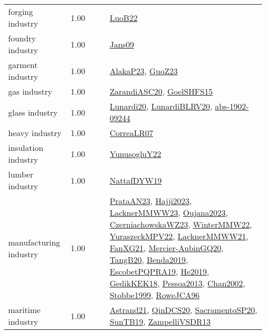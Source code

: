 {\begin{longtable}{p{3cm}r>{\raggedright\arraybackslash}p{6cm}>{\raggedright\arraybackslash}p{6cm}>{\raggedright\arraybackslash}p{8cm}}
\index{forging industry}\index{Industries!forging industry}forging industry &  1.00 &  &  & \hyperref[detail:LuoB22]{LuoB22}\\
\index{foundry industry}\index{Industries!foundry industry}foundry industry &  1.00 &  &  & \hyperref[detail:Jans09]{Jans09}\\
\index{garment industry}\index{Industries!garment industry}garment industry &  1.00 &  &  & \hyperref[detail:AlakaP23]{AlakaP23}, \hyperref[detail:GuoZ23]{GuoZ23}\\
\index{gas industry}\index{Industries!gas industry}gas industry &  1.00 &  &  & \hyperref[detail:ZarandiASC20]{ZarandiASC20}, \hyperref[detail:GoelSHFS15]{GoelSHFS15}\\
\index{glass industry}\index{Industries!glass industry}glass industry &  1.00 &  &  & \hyperref[detail:Lunardi20]{Lunardi20}, \hyperref[detail:LunardiBLRV20]{LunardiBLRV20}, \hyperref[detail:abs-1902-09244]{abs-1902-09244}\\
\index{heavy industry}\index{Industries!heavy industry}heavy industry &  1.00 &  &  & \hyperref[detail:CorreaLR07]{CorreaLR07}\\
\index{insulation industry}\index{Industries!insulation industry}insulation industry &  1.00 &  &  & \hyperref[detail:YunusogluY22]{YunusogluY22}\\
\index{lumber industry}\index{Industries!lumber industry}lumber industry &  1.00 &  &  & \hyperref[detail:NattafDYW19]{NattafDYW19}\\
\index{manufacturing industry}\index{Industries!manufacturing industry}manufacturing industry &  1.00 &  &  & \hyperref[detail:PrataAN23]{PrataAN23}, \hyperref[detail:Hajji2023]{Hajji2023}, \hyperref[detail:LacknerMMWW23]{LacknerMMWW23}, \hyperref[detail:Oujana2023]{Oujana2023}, \hyperref[detail:CzerniachowskaWZ23]{CzerniachowskaWZ23}, \hyperref[detail:WinterMMW22]{WinterMMW22}, \hyperref[detail:YuraszeckMPV22]{YuraszeckMPV22}, \hyperref[detail:LacknerMMWW21]{LacknerMMWW21}, \hyperref[detail:FanXG21]{FanXG21}, \hyperref[detail:Mercier-AubinGQ20]{Mercier-AubinGQ20}, \hyperref[detail:TangB20]{TangB20}, \hyperref[detail:Benda2019]{Benda2019}, \hyperref[detail:EscobetPQPRA19]{EscobetPQPRA19}, \hyperref[detail:He2019]{He2019}, \hyperref[detail:GedikKEK18]{GedikKEK18}, \hyperref[detail:Pessoa2013]{Pessoa2013}, \hyperref[detail:Chan2002]{Chan2002}, \hyperref[detail:Stobbe1999]{Stobbe1999}, \hyperref[detail:RoweJCA96]{RoweJCA96}\\
\index{maritime industry}\index{Industries!maritime industry}maritime industry &  1.00 &  &  & \hyperref[detail:Astrand21]{Astrand21}, \hyperref[detail:QinDCS20]{QinDCS20}, \hyperref[detail:SacramentoSP20]{SacramentoSP20}, \hyperref[detail:SunTB19]{SunTB19}, \hyperref[detail:ZampelliVSDR13]{ZampelliVSDR13}\\

\end{longtable}}
